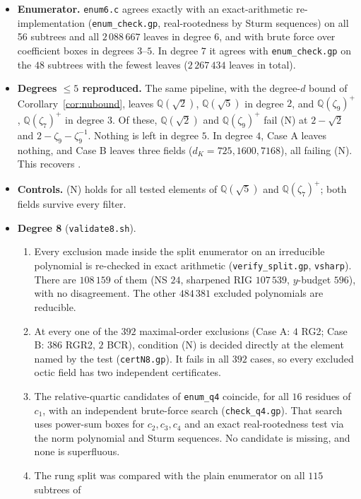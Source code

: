 \documentclass[11pt]{amsart}
\theoremstyle{definition}
\newcommand{\Q}{\mathbb{Q}}
\newcommand{\file}[1]{\texttt{#1}}
\begin{document}
\begin{itemize}[leftmargin=*]
\item \textbf{Enumerator.}  \file{enum6.c} agrees exactly with an exact-arithmetic
  re-implementation (\file{enum\_check.gp}, real-rootedness by Sturm sequences) on all 56
  subtrees and all $2\,088\,667$ leaves in degree $6$, and with brute force over coefficient
  boxes in degrees $3$--$5$.  In degree $7$ it agrees with \file{enum\_check.gp} on
  the $48$ subtrees with the fewest leaves ($2\,267\,434$ leaves in total).
\item \textbf{Degrees $\le5$ reproduced.}  The same pipeline, with the degree-$d$ bound of
  Corollary~\ref{cor:nubound}, leaves $\Q(\sqrt2)$, $\Q(\sqrt5)$ in degree $2$, and
  $\Q(\zeta_9)^+$, $\Q(\zeta_7)^+$ in degree $3$.  Of these, $\Q(\sqrt2)$ and
  $\Q(\zeta_9)^+$ fail (N) at $2-\sqrt2$ and $2-\zeta_9-\zeta_9^{-1}$.  Nothing is left in
  degree $5$.  In degree $4$, Case A leaves nothing, and Case B leaves three fields
  ($d_K=725,1600,7168$), all failing (N).  This recovers \cite[Thm.~1.2]{KY-EB}.
\item \textbf{Controls.}  (N) holds for all tested elements of $\Q(\sqrt5)$ and
  $\Q(\zeta_7)^+$; both fields survive every filter.
\item \textbf{Degree 8} (\file{validate8.sh}).
  \begin{enumerate}[label=(\alph*)]
  \item Every exclusion made inside the split enumerator on an irreducible polynomial is
    re-checked in exact arithmetic (\file{verify\_split.gp}, \texttt{vsharp}).  There are
    $108\,159$ of them (NS $24$, sharpened RIG $107\,539$, $y$-budget $596$), with no
    disagreement.  The other $484\,381$ excluded polynomials are reducible.
  \item At every one of the $392$ maximal-order exclusions (Case A: $4$ RG2; Case B:
    $386$ RGR2, $2$ BCR), condition (N) is decided directly at the element named by the test
    (\file{certN8.gp}).  It fails in all $392$ cases, so every excluded octic field has two
    independent certificates.
  \item The relative-quartic candidates of \texttt{enum\_q4} coincide, for all $16$ residues
    of $c_1$, with an independent brute-force search (\file{check\_q4.gp}).  That search uses
    power-sum boxes for $c_2,c_3,c_4$ and an exact real-rootedness test via the norm
    polynomial and Sturm sequences.  No candidate is missing, and none is superfluous.
  \item The rung split was compared with the plain enumerator on all $115$ subtrees of

\end{enumerate}
\end{itemize}
\end{document}

